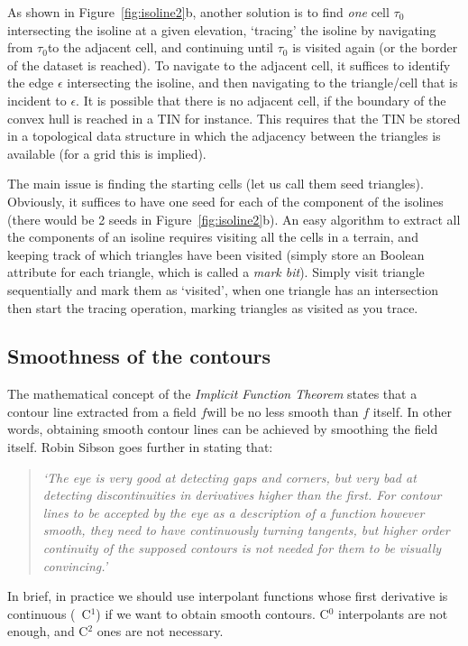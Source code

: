%

As shown in Figure~\ref{fig:isoline2}b, another solution is to find \emph{one} cell \(\tau_0\) intersecting the isoline at a given elevation, `tracing' the isoline by navigating from \(\tau_0\)to the adjacent cell, and continuing until \(\tau_0\) is visited again (or the border of the dataset is reached).
To navigate to the adjacent cell, it suffices to identify the edge $\epsilon$ intersecting the isoline, and then navigating to the triangle/cell that is incident to $\epsilon$.
It is possible that there is no adjacent cell, if the boundary of the convex hull is reached in a TIN for instance.
This requires that the TIN be stored in a topological data structure in which the adjacency between the triangles is available (for a grid this is implied).

The main issue is finding the starting cells (let us call them seed triangles).
Obviously, it suffices to have one seed for each of the component of the isolines (there would be 2 seeds in Figure~\ref{fig:isoline2}b).
An easy algorithm to extract all the components of an isoline requires visiting all the cells in a terrain, and keeping track of which triangles have been visited (simply store an Boolean attribute for each triangle, which is called a \emph{mark bit}).
Simply visit triangle sequentially and mark them as `visited', when one triangle has an intersection then start the tracing operation, marking triangles as visited as you trace. 


\subsection{Smoothness of the contours}%
\label{sec:smoothness-contours}

The mathematical concept of the \emph{Implicit Function Theorem} states that a contour line extracted from a field \(f\)will be no less smooth than \(f\) itself.
In other words, obtaining smooth contour lines can be achieved by smoothing the field itself.
Robin Sibson goes further in stating that:
\begin{quote}
  \emph{`The eye is very good at detecting gaps and corners, but very bad at detecting discontinuities in derivatives higher than the first. 
  For contour lines to be accepted by the eye as a description of a function however smooth, they need to have continuously turning tangents, but higher order continuity of the supposed contours is not needed for them to be visually convincing.'}
\end{quote}
In brief, in practice we should use interpolant functions whose first derivative is continuous (\ie\ C\(^1\)) if we want to obtain smooth contours. 
C\(^0\) interpolants are not enough, and C\(^2\) ones are not necessary.


